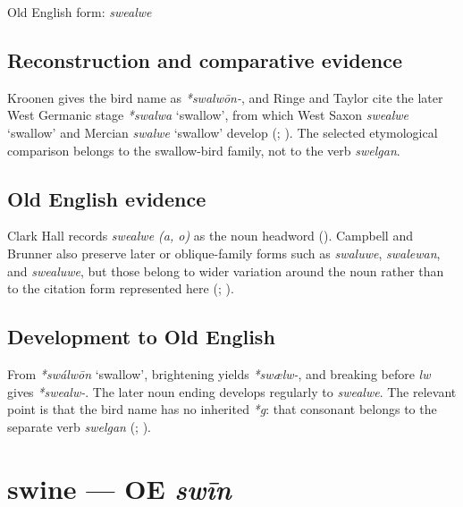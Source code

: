 \documentclass[
  british,
  a4paper,
  openany]{book}
\providecommand{\Recon}[1]{\emph{*#1}}
{\catcode`→=\active \global\def→{\ensuremath{\rightarrow}}}
\providecommand{\texorpdfstring}[2]{#1}
\providecommand{\Recon}[1]{\emph{*#1}}
{\catcode`→=\active \global\def→{\ensuremath{\rightarrow}}}
\begin{document}
Old English form: \emph{swealwe}

\subsection{Reconstruction and comparative
evidence}\label{reconstruction-and-comparative-evidence-53}

Kroonen gives the bird name as \emph{*swalwōn-}, and Ringe and Taylor
cite the later West Germanic stage \Recon{swalwa} `swallow', from which
West Saxon {\emph{swealwe}} `swallow' and Mercian {\emph{swalwe}}
`swallow' develop (;
). The
selected etymological comparison belongs to the swallow-bird family, not
to the verb \emph{swelgan}.

\subsection{Old English evidence}\label{old-english-evidence-53}

Clark Hall records \emph{swealwe (a, o)} as the noun headword
(). Campbell and Brunner
also preserve later or oblique-family forms such as \emph{swaluwe},
\emph{swalewan}, and \emph{swealuwe}, but those belong to wider
variation around the noun rather than to the citation form represented
here (;
).

\subsection{Development to Old
English}\label{development-to-old-english-53}

From \Recon{swálwōn} `swallow', brightening yields \emph{*swælw-}, and
breaking before \emph{lw} gives \emph{*swealw-}. The later noun ending
develops regularly to \emph{swealwe}. The relevant point is that the
bird name has no inherited \emph{*g}: that consonant belongs to the
separate verb \emph{swelgan} (; ).

\section{\texorpdfstring{swine --- OE
\emph{swīn}}{swine --- OE swīn}}\label{swine-oe-swux12bn}
\end{document}
